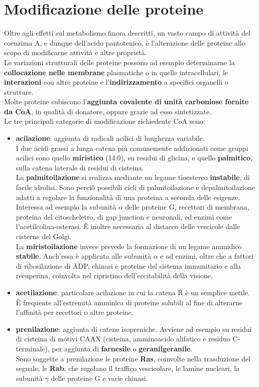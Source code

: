 \documentclass[a4paper, 12pt]{article}
\begin{document}
\section{Modificazione delle proteine}
Oltre agli effetti sul metabolismo finora descritti, un vasto campo di attività del coenzima A, e dunque dell'acido pantotenico, è l'alterazione delle proteine allo scopo di modificarne attività e altre proprietà.\\
Le variazioni strutturali delle proteine possono ad esempio determinarne la \textbf{collocazione nelle membrane} plasmatiche o in quelle intracellulari, le \textbf{interazioni} con altre proteine e l'\textbf{indirizzamento} a specifici organelli o strutture.\\
Molte proteine subiscono l'\textbf{aggiunta covalente di unità carboniose fornite da CoA}, in qualità di donatore, oppure grazie ad esso sintetizzate.\\
Le tre principali categorie di modificazione richiedente CoA sono:
\begin{itemize}
\item \textbf{acilazione}: aggiunta di radicali acilici di lunghezza variabile.\\ I due acidi grassi a lunga catena più comunemente addizionati come gruppi acilici sono quello \textbf{miristico} (14:0), su residui di glicina, e quello \textbf{palmitico}, sulla catena laterale di residui di cisteina.\\
La \textbf{palmitoilazione} si realizza mediante un legame tioestereo \textbf{instabile}, di facile idrolisi. Sono perciò possibili cicli di palmitoilazione e depalmitoilazione adatti a regolare la funzionalità di una proteina a seconda delle esigenze. Interessa ad esempio la subunità $\alpha$ delle proteine G, recettori di membrana, proteina del citoscheletro, di gap junction e neuronali, ed enzimi come l'acetilcolina-esterasi. È inoltre necessaria al distacco delle vescicole dalle cisterne del Golgi.\\
La \textbf{miristoilazione} invece prevede la formazione di un legame ammidico \textbf{stabile}. Anch'essa è applicata alle subunità $\alpha$ e ad enzimi, oltre che a fattori di ribosilazione di ADP, chinasi e proteine del sistema immunitario e alla recuperina, coinvolta nel ripristino dell'eccitabilità della visione.
\item \textbf{acetilazione}: particolare acilazione in cui la catena R è un semplice metile.\\ È frequente all'estremità amminica di proteine solubili al fine di alterarne l'affinità per recettori o altre proteine.
\item \textbf{prenilazione}: aggiunta di catene isopreniche.
Avviene ad esempio su residui di cisteina di motivi CAAX (cisteina, amminoacido alifatico e residuo C-terminale), per aggiunta di \textbf{farnesile} o \textbf{geranilgeranile}.\\
Sono soggette a prenilazione le proteine \textbf{Ras}, coinvolte nella trasduzione del segnale, le \textbf{Rab}, che regolano il traffico vescicolare, le lamìne nucleari, la subunità $\gamma$ delle proteine G e varie chinasi.
\end{itemize}
\end{document}
